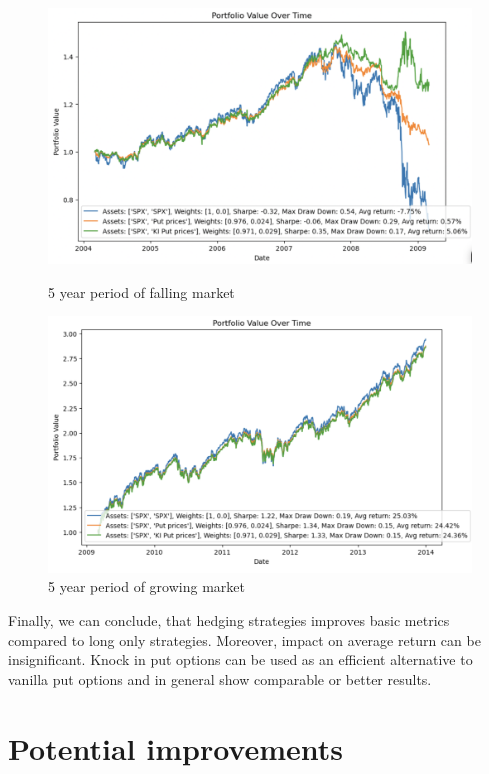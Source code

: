 \documentclass[12pt]{article}
\begin{document}
{{\begin{figure}[!tbp]
\centering
  \begin{minipage}[b]{0.45\textwidth}
    \includegraphics[width=\textwidth]{5yearfalling.png}
    \caption{5 year period of falling market}
  \end{minipage}
  \hfill
  \begin{minipage}[b]{0.45\textwidth}
    \includegraphics[width=\textwidth]{5Ygrowing.png}
    \caption{5 year period of growing market}
  \end{minipage}
\end{figure}

\qquad Finally, we can conclude, that hedging strategies improves basic metrics compared to long only strategies. Moreover, impact on average return can be insignificant. Knock in put options can be used as an efficient alternative to vanilla put options and in general show comparable or better results.

\section{Potential improvements}
}}
\end{document}
